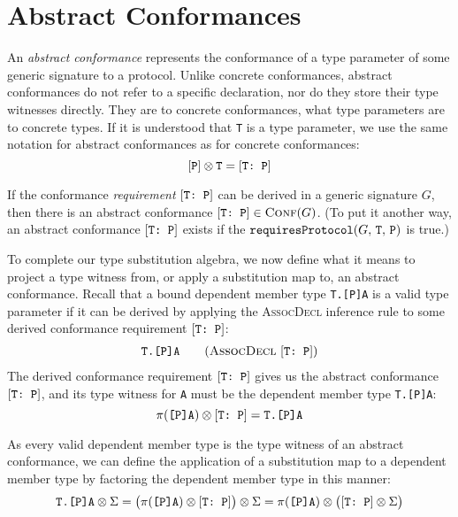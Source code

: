 \documentclass[../generics]{subfiles}
\begin{document}
\section{Abstract Conformances}\label{abstract conformances}

An \emph{abstract conformance} represents the conformance of a type parameter of some generic signature to a protocol. Unlike concrete conformances, abstract conformances do not refer to a specific declaration, nor do they store their type witnesses directly. They are to concrete conformances, what type parameters are to concrete types. If it is understood that \texttt{T} is a type parameter, we use the same notation for abstract conformances as for concrete conformances:
\[[\texttt{P}]\otimes\texttt{T} = [\texttt{T:~P}]\]

If the conformance \emph{requirement} $[\texttt{T:~P}]$ can be derived in a generic signature $G$, then there is an abstract conformance $[\texttt{T:~P}]\in\textsc{Conf}({G})$. (To put it another way, an abstract conformance $[\texttt{T:~P}]$ exists if the $\texttt{requiresProtocol}(G,\,\texttt{T},\,\texttt{P})$ is true.)

To complete our type substitution algebra, we now define what it means to project a type witness from, or apply a substitution map to, an abstract conformance. Recall that a bound dependent member type \texttt{T.[P]A} is a valid type parameter if it can be derived by applying the \textsc{AssocDecl} inference rule to some derived conformance requirement $[\texttt{T:~P}]$:
\begin{gather*}
\AssocDeclStepDef
\end{gather*}
The derived conformance requirement $[\texttt{T:~P}]$ gives us the abstract conformance $[\texttt{T:~P}]$, and its type witness for \texttt{A} must be the dependent member type \texttt{T.[P]A}:
\[\pi(\texttt{[P]A}) \otimes [\texttt{T:~P}] = \texttt{T.[P]A}\]

As every valid dependent member type is the type witness of an abstract conformance, we can define the application of a substitution map to a dependent member type by factoring the dependent member type in this manner:
\[\texttt{T.[P]A}\otimes\Sigma=\bigl(\pi(\texttt{[P]A}) \otimes [\texttt{T:~P}]\bigr)\otimes\Sigma=\pi(\texttt{[P]A})\otimes\bigl([\texttt{T:~P}]\otimes\Sigma\bigr)\]
\end{document}
